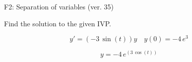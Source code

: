 \begin{exercise}
  \begin{exerciseTitle}F2: Separation of variables (ver. 35)\end{exerciseTitle}
  \begin{exerciseStatement}
    
Find the solution to the given IVP.

    
\[y'=( -3 \, \sin\left(t\right) )y\hspace{1em} y(0)= -4 \, e^{3}\]

  \end{exerciseStatement}
  \begin{exerciseAnswer}
    
\[y= -4 \, e^{\left(3 \, \cos\left(t\right)\right)}\]

  \end{exerciseAnswer}
\end{exercise}